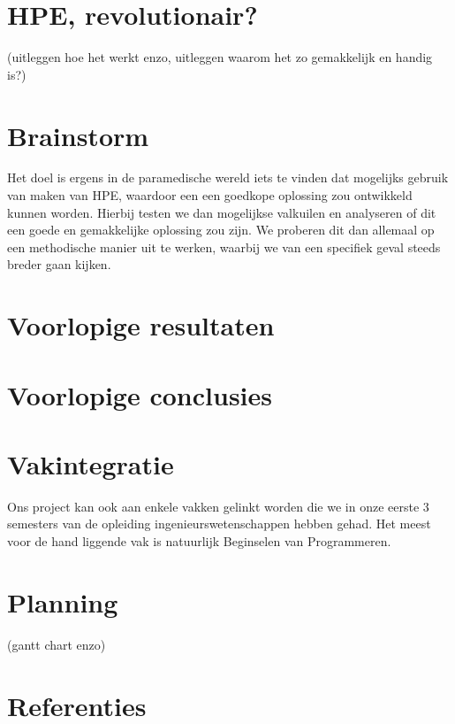 \documentclass{article}
\begin{document}
\section{HPE, revolutionair?}
(uitleggen hoe het werkt enzo, uitleggen waarom het zo gemakkelijk en handig is?)

\section{Brainstorm}
Het doel is ergens in de paramedische wereld iets te vinden dat mogelijks gebruik van maken van HPE, waardoor een een goedkope oplossing zou ontwikkeld kunnen worden. Hierbij testen we dan mogelijkse valkuilen en analyseren of dit een goede en gemakkelijke oplossing zou zijn. We proberen dit dan allemaal op een methodische manier uit te werken, waarbij we van een specifiek geval steeds breder gaan kijken.
\section{Voorlopige resultaten}

\section{Voorlopige conclusies}

\section{Vakintegratie}
Ons project kan ook aan enkele vakken gelinkt worden die we in onze eerste 3 semesters van de opleiding ingenieurswetenschappen hebben gehad. Het meest voor de hand liggende vak is natuurlijk Beginselen van Programmeren.
\section{Planning}
(gantt chart enzo)

\section{Referenties}
\end{document}
